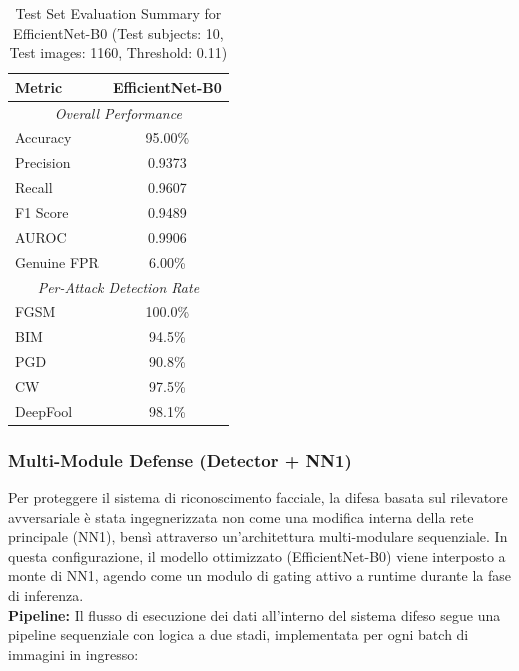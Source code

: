 \documentclass[a4paper, 12pt]{article}
\begin{document}
\begin{table}[H]
    \centering
    \caption{Test Set Evaluation Summary for EfficientNet-B0 (Test subjects: 10, Test images: 1160, Threshold: 0.11)}
    \label{tab:evaluation_summary_efficientnet}
    \begin{tabular}{lc}
        \toprule
        \textbf{Metric} & \textbf{EfficientNet-B0} \\
        \midrule
        \multicolumn{2}{c}{\textit{Overall Performance}} \\
        \midrule
        Accuracy & 95.00\% \\
        Precision & 0.9373 \\
        Recall & 0.9607 \\
        F1 Score & 0.9489 \\
        AUROC & 0.9906 \\
        Genuine FPR & 6.00\% \\
        \midrule
        \multicolumn{2}{c}{\textit{Per-Attack Detection Rate}} \\
        \midrule
        FGSM & 100.0\% \\
        BIM & 94.5\% \\
        PGD & 90.8\% \\
        CW & 97.5\% \\
        DeepFool & 98.1\% \\
        \bottomrule
    \end{tabular}
\end{table}



\vspace{10pt}


\subsubsection{Multi-Module Defense (Detector + NN1)}

Per proteggere il sistema di riconoscimento facciale, la difesa basata sul rilevatore avversariale è stata 
ingegnerizzata non come una modifica interna della rete principale (NN1), bensì attraverso un'architettura multi-modulare 
sequenziale. In questa configurazione, il modello ottimizzato (EfficientNet-B0) viene interposto a monte di NN1, 
agendo come un modulo di gating attivo a runtime durante la fase di inferenza.\\


\textbf{Pipeline:}
Il flusso di esecuzione dei dati all'interno del sistema difeso segue una pipeline 
sequenziale con logica a due stadi, implementata per  ogni batch di immagini in ingresso:
\end{document}
